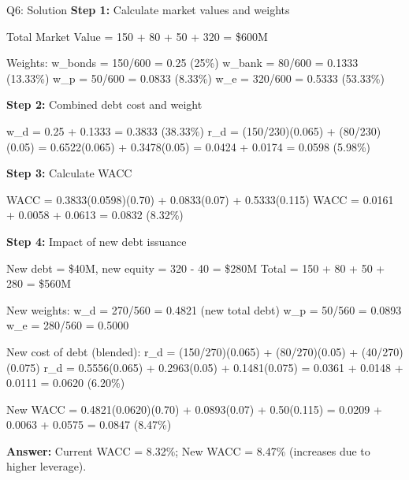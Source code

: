 \documentclass{beamer}
\renewcommand{\scriptsize}{\fontsize{6pt}{7pt}\selectfont}
\begin{document}
	\begin{frame}{Q6: Solution}
		\scriptsize
		\textbf{Step 1:} Calculate market values and weights
		
		Total Market Value = 150 + 80 + 50 + 320 = \$600M
		
		Weights:
		w\_bonds = 150/600 = 0.25 (25\%)
		w\_bank = 80/600 = 0.1333 (13.33\%)
		w\_p = 50/600 = 0.0833 (8.33\%)
		w\_e = 320/600 = 0.5333 (53.33\%)
		
		\textbf{Step 2:} Combined debt cost and weight
		
		w\_d = 0.25 + 0.1333 = 0.3833 (38.33\%)
		r\_d = (150/230)(0.065) + (80/230)(0.05) = 0.6522(0.065) + 0.3478(0.05) = 0.0424 + 0.0174 = 0.0598 (5.98\%)
		
		\textbf{Step 3:} Calculate WACC
		
		WACC = 0.3833(0.0598)(0.70) + 0.0833(0.07) + 0.5333(0.115)
		WACC = 0.0161 + 0.0058 + 0.0613 = 0.0832 (8.32\%)
		
		\textbf{Step 4:} Impact of new debt issuance
		
		New debt = \$40M, new equity = 320 - 40 = \$280M
		Total = 150 + 80 + 50 + 280 = \$560M
		
		New weights:
		w\_d = 270/560 = 0.4821 (new total debt)
		w\_p = 50/560 = 0.0893
		w\_e = 280/560 = 0.5000
		
		New cost of debt (blended): r\_d = (150/270)(0.065) + (80/270)(0.05) + (40/270)(0.075)
		r\_d = 0.5556(0.065) + 0.2963(0.05) + 0.1481(0.075) = 0.0361 + 0.0148 + 0.0111 = 0.0620 (6.20\%)
		
		New WACC = 0.4821(0.0620)(0.70) + 0.0893(0.07) + 0.50(0.115)
		= 0.0209 + 0.0063 + 0.0575 = 0.0847 (8.47\%)
		
		\textbf{Answer:} Current WACC = 8.32\%; New WACC = 8.47\% (increases due to higher leverage).
	\end{frame}
	
\end{document}
